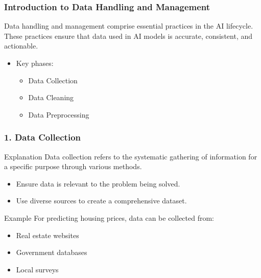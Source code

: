 \documentclass[aspectratio=169]{beamer}
\begin{document}
\begin{frame}
    \frametitle{Introduction to Data Handling and Management}
    Data handling and management comprise essential practices in the AI lifecycle. These practices ensure that data used in AI models is accurate, consistent, and actionable.
    
    \begin{itemize}
        \item Key phases:
        \begin{itemize}
            \item Data Collection
            \item Data Cleaning
            \item Data Preprocessing
        \end{itemize}
    \end{itemize}
\end{frame}

\begin{frame}
    \frametitle{1. Data Collection}
    \begin{block}{Explanation}
        Data collection refers to the systematic gathering of information for a specific purpose through various methods.
    \end{block}

    \begin{itemize}
        \item Ensure data is relevant to the problem being solved.
        \item Use diverse sources to create a comprehensive dataset.
    \end{itemize}

    \begin{block}{Example}
        For predicting housing prices, data can be collected from:
        \begin{itemize}
            \item Real estate websites
            \item Government databases
            \item Local surveys
        \end{itemize}
    \end{block}
\end{frame}
\end{document}

